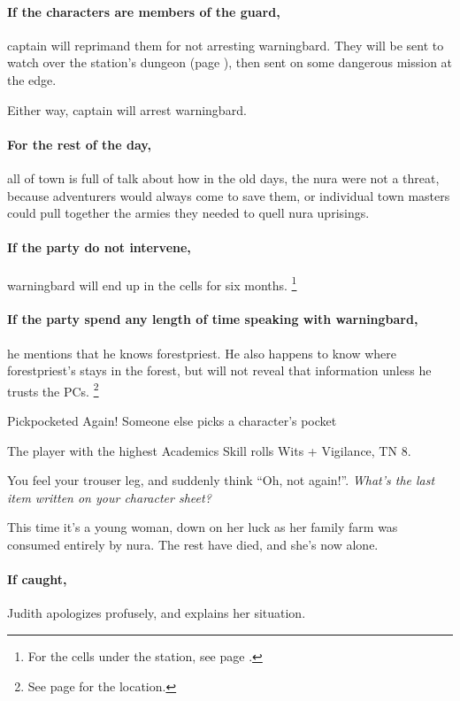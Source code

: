 \begin{multicols}{2}
\paragraph{If the characters are members of the \gls{guard},}
\gls{captain} will reprimand them for not arresting \gls{warningbard}.
They will be sent to watch over the station's dungeon (page \pageref{stationDungeon}), then sent on some dangerous mission at the \gls{edge}.

Either way, \gls{captain} will arrest \gls{warningbard}.

\paragraph{For the rest of the day,}
all of \gls{town} is full of talk about how in the old days, the nura were not a threat, because adventurers would always come to save them, or individual town masters could pull together the armies they needed to quell nura uprisings.

\paragraph{If the party do not intervene,}
\gls{warningbard} will end up in the cells for six months.
\footnote{For the cells under the  station, see page \pageref{guardstation}.}

\warningbard

\paragraph{If the party spend any length of time speaking with \gls{warningbard},}
he mentions that he knows \gls{forestpriest}.
He also happens to know where \gls{forestpriest}'s stays in the forest, but will not reveal that information unless he trusts the PCs.
\footnote{See page \pageref{lostcity} for the location.}

{Pickpocketed Again!}%
{Someone else picks a character's pocket}%

The player with the highest Academics Skill rolls Wits + Vigilance, TN 8.

\begin{boxtext}

  You feel your trouser leg, and suddenly think ``Oh, not again!''.  \textit{What's the last item written on your character sheet?}

\end{boxtext}

This time it's a young woman, down on her luck as her family farm was consumed entirely by nura.
The rest have died, and she's now alone.

\paragraph{If caught,}
Judith apologizes profusely, and explains her situation.



\end{multicols}

\stopcontents[Town]

\stopcontents[sq]

